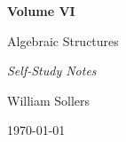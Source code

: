 \begin{titlepage}
\centering

\vspace*{5cm}

{\Huge\bfseries Volume VI\par}

\vspace{0.5cm}

{\LARGE Algebraic Structures\par}

\vspace{0.5cm}

{\large\itshape Self-Study Notes\par}

\vfill

{\large William Sollers\par}

\vspace{0.5cm}

{\large \today\par}

\end{titlepage}

